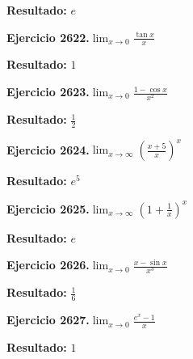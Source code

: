 \documentclass[10pt,a4paper]{article}
\begin{document}
\begin{solbox}
\textbf{Resultado:} \(\displaystyle e\)
\end{solbox}

\newpage
\begin{ejbox}
\textbf{Ejercicio 2622.}\quad $\lim_{x\to 0} \frac{\tan x}{x}$
\end{ejbox}

\begin{solbox}
\textbf{Resultado:} \(\displaystyle 1\)
\end{solbox}

\begin{ejbox}
\textbf{Ejercicio 2623.}\quad $\lim_{x\to 0} \frac{1-\cos x}{x^2}$
\end{ejbox}

\begin{solbox}
\textbf{Resultado:} \(\displaystyle \frac{1}{2}\)
\end{solbox}

\begin{ejbox}
\textbf{Ejercicio 2624.}\quad $\lim_{x\to \infty} \left(\frac{x+5}{x}\right)^{x}$
\end{ejbox}

\begin{solbox}
\textbf{Resultado:} \(\displaystyle e^{5}\)
\end{solbox}

\newpage
\begin{ejbox}
\textbf{Ejercicio 2625.}\quad $\lim_{x\to \infty} \left(1+\frac{1}{x}\right)^x$
\end{ejbox}

\begin{solbox}
\textbf{Resultado:} \(\displaystyle e\)
\end{solbox}

\begin{ejbox}
\textbf{Ejercicio 2626.}\quad $\lim_{x\to 0} \frac{x-\sin x}{x^3}$
\end{ejbox}

\begin{solbox}
\textbf{Resultado:} \(\displaystyle \frac{1}{6}\)
\end{solbox}

\begin{ejbox}
\textbf{Ejercicio 2627.}\quad $\lim_{x\to 0} \frac{e^x-1}{x}$
\end{ejbox}

\begin{solbox}
\textbf{Resultado:} \(\displaystyle 1\)
\end{solbox}
\end{document}
